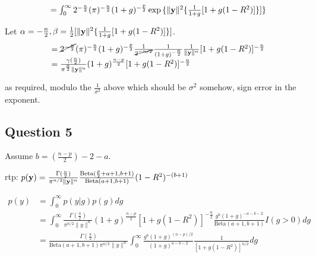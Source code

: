 \documentclass{amsart}[12pt]
\begin{document}
\begin{equation*}
	\begin{array}{ll}
		  & = \int_0^\infty 2^{-\frac{n}{2}} (\pi)^{-\frac{n}{2}} (1 + g)^{-\frac{p}{2}} \exp{\{ \| {\bf y}\|^2 \{ \frac{1}{1 + g} [1 + g(1 - R^2)] \}} ] \} 
	\end{array}
\end{equation*}

Let $\alpha = -\frac{n}{2}, \beta = \tfrac{1}{2} [\| {\bf y} \|^2 \{ \frac{1}{1 + g} [1 + g(1 - R^2)] \}]$.
\begin{equation*}
	\begin{array}{ll}
		  & = \cancel{2^{- \frac{n}{2}}} (\pi)^{-\frac{n}{2}} (1 + g)^{-\frac{p}{2}} \frac{1}{\cancel{2^{-n/2}}} \frac{1}{(1 + g)^{-\frac{n}{2}}} \frac{1}{\| {\bf y} \|^n} [1 + g(1 - R^2)]^{-\frac{n}{2}} \\
		  & = \frac{\gamma(\frac{n}{2})}{\pi^{\frac{n}{2}} \| {\bf y} \|^n} (1 + g)^{\frac{n - p}{2}} [1 + g(1 - R^2)]^{-\frac{n}{2}}                                                                       
	\end{array}
\end{equation*}

as required, modulo the $\frac{1}{\sigma^2}$ above which should be $\sigma^2$ somehow, sign error in the
exponent.

\subsection{Question 5}

Assume $b = (\frac{n - p}{2}) - 2 - a$.

rtp: $p({\bf y}) = \frac{\Gamma(\frac{n}{2})}{\pi^{n/2} \| {\bf y} \|^n} \frac{\text{Beta}(\frac{p}{2} + a + 1, b + 1)}{\text{Beta}(a + 1, b + 1)} (1 - R^2)^{-(b + 1)}$

\begin{equation*}
	\begin{array}{ll}
		p(y) & = \int_0^\infty p(y|g) p(g) dg                                                                                                                                                                  \\
		     & = \int_0^\infty \frac{\Gamma(\frac{n}{2})}{\pi^{n/2} \| y \|^n} (1 + g)^{\frac{n - p}{2}}[1 + g(1 - R^2)]^{-\frac{n}{2}} \frac{g^b (1 + g)^{-a - b - 2}}{\text{Beta}(a + 1, b + 1)} I(g > 0) dg \\
		     & = \frac{\Gamma(\frac{n}{2})}{\text{Beta}(a + 1, b + 1) \pi^{n/2} \| y \|^n}                                                                                                                     
		\int_0^\infty \frac{g^b (1 + g)^{(n - p)/2}}{(1 + g)^{a - b - 2}} \frac{1}{[1 + g(1 - R^2)]^{n/2}} dg
	\end{array}
\end{equation*}
\end{document}
